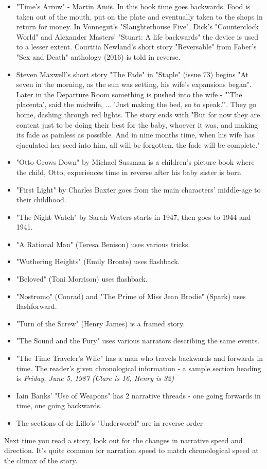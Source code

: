 \documentclass[11pt]{article}
\begin{document}
\begin{itemize}
\item  "Time's Arrow" - Martin Amis. In this book time goes backwards. Food is
taken out of the mouth, put on the plate and eventually taken to the shops in
return for money. In Vonnegut's "Slaughterhouse Five", Dick's "Counterclock
  World" and Alexander
    Masters' "Stuart: A life backwards" the device is used to a lesser extent. Courttia Newland's short story "Reversable"  from Faber's "Sex and Death" anthology (2016) is told in reverse.
\item Steven Maxwell's short story "The Fade" in "Staple" (issue 73) begins "At
  seven in the morning, as the sun was setting, his wife's expansions
  began". Later in the Departure Room something is pushed into the wife - "'The
  placenta', said the midwife, ... 'Just making the bed, so to speak.'". They
  go home, dashing through red lights. The story ends with "But for now they
  are content just to be doing their best for the baby, whoever it was, and
  making its fade as painless as possible. And in nine months time, when his
  wife has ejaculated her seed into him, all will be forgotten, the fade will
  be complete."
\item "Otto Grows Down" by Michael Sussman is a children's picture book where the child, Otto, experiences time in reverse after his baby sister is born 
\item "First Light" by Charles Baxter goes from the main characters' middle-age to their childhood.
\item "The Night Watch" by Sarah Waters starts in 1947, then goes to 1944 and 1941.
\item  "A Rational Man" (Teresa Benison) uses various tricks.
\item  "Wuthering Heights" (Emily Bronte) uses flashback.
\item  "Beloved" (Toni Morrison) uses flashback.
\item  "Nostromo" (Conrad) and "The Prime of Miss Jean Brodie" (Spark) uses flashforward.
\item  "Turn of the Screw" (Henry James) is a framed story.
\item  "The Sound and the Fury" uses various narrators describing the same events.
\item  "The Time Traveler's Wife" has a man who travels backwards and forwards in time. The reader's given chronological information - a sample section heading is \textit{Friday, June 5, 1987 (Clare is 16, Henry is 32)}
\item Iain Banks' "Use of Weapons" has 2 narrative threads - one going forwards in time, one going backwards.
\item The sections of de Lillo's "Underworld"  are in reverse order
\end{itemize}
Next time you read a story, look out for the changes in narrative speed and direction. It's quite common for narration speed to match chronological speed at the climax of the story. 
\end{document}
